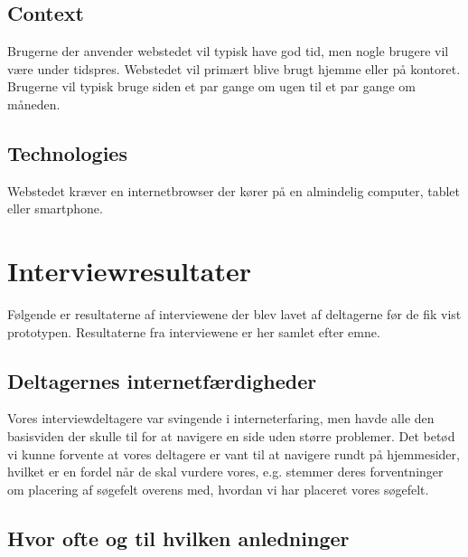\documentclass[a4paper, 12pt]{article}
\begin{document}
\subsection{Context}

Brugerne der anvender webstedet vil typisk have god tid, men nogle brugere vil
være under tidspres. Webstedet vil primært blive brugt hjemme eller på kontoret.
Brugerne vil typisk bruge siden et par gange om ugen til et par gange om
måneden.

\subsection{Technologies}

Webstedet kræver en internetbrowser der kører på en almindelig computer, tablet
eller smartphone.

\section{Interviewresultater}
\label{sec:Interviewresultater}
Følgende er resultaterne af interviewene der blev lavet af deltagerne før de fik vist prototypen.
Resultaterne fra interviewene er her samlet efter emne.

\subsection{Deltagernes internetfærdigheder}

Vores interviewdeltagere var svingende i interneterfaring, men havde alle den basisviden
der skulle til for at navigere en side uden større problemer. Det betød vi kunne
forvente at vores deltagere er vant til at navigere rundt på hjemmesider, hvilket
er en fordel når de skal vurdere vores, e.g. stemmer deres forventninger om
placering af søgefelt overens med, hvordan vi har placeret vores søgefelt.



\subsection{Hvor ofte og til hvilken anledninger}
\end{document}
